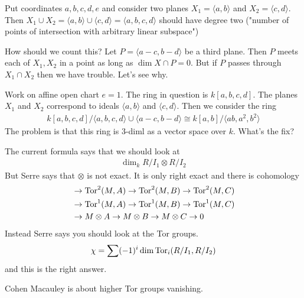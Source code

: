 \documentclass[12pt]{article}
\begin{document}
\begin{example}
     Put coordinates $a,b,c,d,e$ and consider two planes
    $X_1 = \langle a,b\rangle$ and $X_2 = \langle c,d\rangle$.
    Then $X_1\cup X_2 = \langle a,b\rangle\cup \langle c,d\rangle = \langle a,b,c,d\rangle$
    should have degree two ("number of points of intersection with arbitrary linear subspace")
    
    \hfill

    How should we count this? Let $P = \langle a- c,b-d\rangle$ be a third plane. Then 
    $P$ meets each of $X_1,X_2$ in a point as long as $\dim X\cap P = 0$. But if $P$ passes through
    $X_1\cap X_2$ then we have trouble. Let's see why.

    \hfill

    Work on affine open chart $e = 1$. The ring in question is $k[a,b,c,d]$. The planes 
    $X_1$ and $X_2$ correspond to ideals $\langle a,b\rangle$ and $\langle c,d\rangle$. 
    Then we consider the ring \begin{align*}
        k[a,b,c,d]/\langle a,b,c,d\rangle \cup \langle a-c, b-d\rangle \cong k[a,b]/\langle ab,a^2,b^2\rangle
    \end{align*} The problem is that this ring is $3$-diml as a vector space over $k$. What's the fix?

    \hfill

    The current formula says that we should look at \begin{align*}
        \dim_k R/I_1\otimes R/I_2
    \end{align*} But Serre says that $\otimes$ is not exact. It is only right exact and there is cohomology
\begin{align*}
    &\rightarrow \operatorname{Tor}^2(M,A) \rightarrow \operatorname{Tor}^2(M,B) \rightarrow \operatorname{Tor}^2(M,C) \\
    &\rightarrow \operatorname{Tor}^1(M,A) \rightarrow \operatorname{Tor}^1(M,B) \rightarrow \operatorname{Tor}^1(M,C) \\
    &\rightarrow M\otimes A \rightarrow M\otimes B \rightarrow M\otimes C \rightarrow 0 \\
\end{align*}
Instead Serre says you should look at the Tor groups.
\begin{align*}
    \chi = \sum (-1)^i \dim \operatorname{Tor}_i(R/I_1,R/I_2)
\end{align*} and this is the right answer.

\hfill

Cohen Macauley is about higher Tor groups vanishing.
\end{example}
\end{document}

